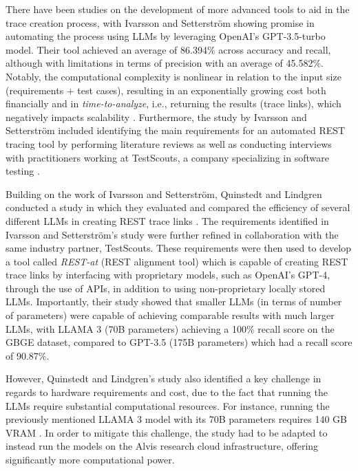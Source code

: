 \documentclass[conference]{IEEEtran}
\begin{document}
There have been studies on the development of more advanced tools to aid in the trace creation process, with Ivarsson and Setterström showing promise in automating the process using LLMs by leveraging OpenAI’s GPT-3.5-turbo model\cite{ivarsson2023automated}. Their tool achieved an average of 86.394\% across accuracy and recall, although with limitations in terms of precision with an average of 45.582\%. Notably, the computational complexity is nonlinear in relation to the input size (requirements + test cases), resulting in an exponentially growing cost both financially and in \textit{time-to-analyze}, i.e., returning the results (trace links), which negatively impacts scalability \cite{ivarsson2023automated}. Furthermore, the study by Ivarsson and Setterström included identifying the main requirements for an automated REST tracing tool by performing literature reviews as well as conducting interviews with practitioners working at TestScouts, a company specializing in software testing \cite{ivarsson2023automated}.

Building on the work of Ivarsson and Setterström, Quinstedt and Lindgren conducted a study in which they evaluated and compared the efficiency of several different LLMs in creating REST trace links \cite{quinstedt2024Optimizing}. The requirements identified in Ivarsson and Setterström's study \cite{ivarsson2023automated} were further refined in collaboration with the same industry partner, TestScouts. These requirements were then used to develop a tool called \textit{REST-at} (REST alignment tool) which is capable of creating REST trace links by interfacing with proprietary models, such as OpenAI's GPT-4, through the use of APIs, in addition to using non-proprietary locally stored LLMs. Importantly, their study showed that smaller LLMs (in terms of number of parameters) were capable of achieving comparable results with much larger LLMs, with LLAMA 3 (70B parameters) achieving a 100\% recall score on the GBGE dataset, compared to GPT-3.5 (175B parameters) which had a recall score of 90.87\%.

However, Quinstedt and Lindgren's study also identified a key challenge in regards to hardware requirements and cost, due to the fact that running the LLMs require substantial computational resources. For instance, running the previously mentioned LLAMA 3 model with its 70B parameters requires 140 GB VRAM \cite{quinstedt2024Optimizing}. In order to mitigate this challenge, the study had to be adapted to instead run the models on the Alvis research cloud  infrastructure, offering significantly more computational power.
\end{document}
